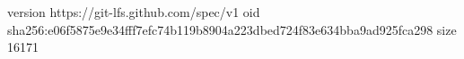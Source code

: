 version https://git-lfs.github.com/spec/v1
oid sha256:e06f5875e9e34fff7efc74b119b8904a223dbed724f83e634bba9ad925fca298
size 16171
